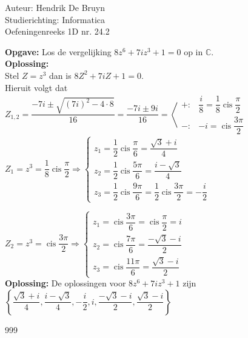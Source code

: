 \documentclass[a4paper]{article}
\newcommand{\cis}{\operatorname{cis}}
\begin{document}
\noindent \large Auteur: Hendrik De Bruyn \\
\noindent \large Studierichting: Informatica\\
\noindent \large Oefeningenreeks 1D nr. 24.2\\

\medskip

\normalsize

\textbf{Opgave: } Los de vergelijking $8z^6 + 7iz^3 + 1 = 0$ op in $\mathbb{C}$. \\

\textbf{Oplossing: } \\

Stel $Z = z^3$ dan is $8Z^2 + 7iZ + 1 = 0$. \\

Hieruit volgt dat $Z_{1,2} = \dfrac{-7i \pm \sqrt{(7i)^2 - 4\cdot8}}{16} = \dfrac{-7i \pm 9i}{16} = \left<\begin{array}{ll}
		+: & \dfrac{i}{8} = \dfrac{1}{8} \cis \dfrac{\pi}{2} \\
		-: & -i = \cis \dfrac{3\pi}{2}
	\end{array}\right.$ \\

$Z_1 = z^3 = \dfrac{1}{8} \cis \dfrac{\pi}{2} \Rightarrow \left\{\begin{array}{l}
	z_1 = \dfrac{1}{2} \cis \dfrac{\pi}{6} = \dfrac{\sqrt{3}+i}{4} \\
	z_2 = \dfrac{1}{2} \cis \dfrac{5\pi}{6} = \dfrac{i-\sqrt{3}}{4} \\
	z_3 = \dfrac{1}{2} \cis \dfrac{9\pi}{6} = \dfrac{1}{2} \cis \dfrac{3\pi}{2} = -\dfrac{i}{2}
\end{array}\right.$

$Z_2 = z^3 = \cis \dfrac{3\pi}{2} \Rightarrow \left\{\begin{array}{l}
	z_1 = \cis \dfrac{3\pi}{6} = \cis \dfrac{\pi}{2} = i \\
	z_2 = \cis \dfrac{7\pi}{6} = \dfrac{-\sqrt{3}-i}{2} \\
	z_3 = \cis \dfrac{11\pi}{6} = \dfrac{\sqrt{3}-i}{2}
\end{array}\right.$ \\

\textbf{Oplossing: } De oplossingen voor $8z^6 + 7iz^3 + 1$ zijn $\left\{\dfrac{\sqrt{3}+i}{4}, \dfrac{i-\sqrt{3}}{4}, -\dfrac{i}{2}, i, \dfrac{-\sqrt{3}-i}{2}, \dfrac{\sqrt{3}-i}{2}\right\}$ \\


\begin{thebibliography}{999}
\end{thebibliography}
\end{document}
